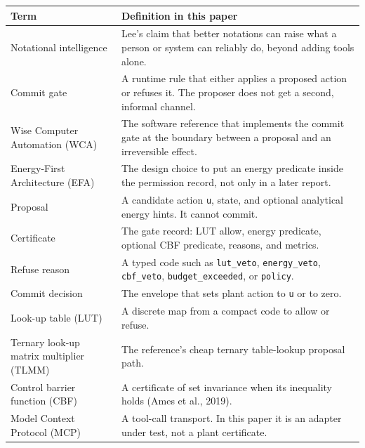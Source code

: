 \documentclass[
  10pt,
]{article}
\newcounter{none} %
\begin{document}
{\def\LTcaptype{none} %
\begin{longtable}[]{@{}
  >{\raggedright\arraybackslash}p{}
  >{\raggedright\arraybackslash}p{}@{}}
\toprule\noalign{}
\begin{minipage}[b]{\linewidth}\raggedright
Term
\end{minipage} & \begin{minipage}[b]{\linewidth}\raggedright
Definition in this paper
\end{minipage} \\
\midrule\noalign{}
\endhead
\bottomrule\noalign{}
\endlastfoot
Notational intelligence & Lee's claim that better notations can raise
what a person or system can reliably do, beyond adding tools alone. \\
Commit gate & A runtime rule that either applies a proposed action or
refuses it. The proposer does not get a second, informal channel. \\
Wise Computer Automation (WCA) & The software reference that implements
the commit gate at the boundary between a proposal and an irreversible
effect. \\
Energy-First Architecture (EFA) & The design choice to put an energy
predicate inside the permission record, not only in a later report. \\
Proposal & A candidate action \texttt{u}, state, and optional analytical
energy hints. It cannot commit. \\
Certificate & The gate record: LUT allow, energy predicate, optional CBF
predicate, reasons, and metrics. \\
Refuse reason & A typed code such as \texttt{lut\_veto},
\texttt{energy\_veto}, \texttt{cbf\_veto}, \texttt{budget\_exceeded}, or
\texttt{policy}. \\
Commit decision & The envelope that sets plant action to \texttt{u} or
to zero. \\
Look-up table (LUT) & A discrete map from a compact code to allow or
refuse. \\
Ternary look-up matrix multiplier (TLMM) & The reference's cheap ternary
table-lookup proposal path. \\
Control barrier function (CBF) & A certificate of set invariance when
its inequality holds (Ames et al., 2019). \\
Model Context Protocol (MCP) & A tool-call transport. In this paper it
is an adapter under test, not a plant certificate. \\

\end{longtable}}
\end{document}

